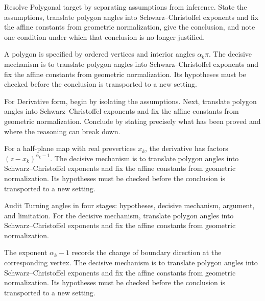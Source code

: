 \begin{problem}\label{prob:iv18-problem-01}
Resolve Polygonal target by separating assumptions from inference. State the assumptions, translate polygon angles into Schwarz--Christoffel exponents and fix the affine constants from geometric normalization, give the conclusion, and note one condition under which that conclusion is no longer justified.
\end{problem}
\begin{solution}
A polygon is specified by ordered vertices and interior angles $\alpha_k\pi$. The decisive mechanism is to translate polygon angles into Schwarz--Christoffel exponents and fix the affine constants from geometric normalization. Its hypotheses must be checked before the conclusion is transported to a new setting.
\end{solution}

\begin{problem}\label{prob:iv18-problem-02}
For Derivative form, begin by isolating the assumptions. Next, translate polygon angles into Schwarz--Christoffel exponents and fix the affine constants from geometric normalization. Conclude by stating precisely what has been proved and where the reasoning can break down.
\end{problem}
\begin{solution}
For a half-plane map with real prevertices $x_k$, the derivative has factors $(z-x_k)^{\alpha_k-1}$. The decisive mechanism is to translate polygon angles into Schwarz--Christoffel exponents and fix the affine constants from geometric normalization. Its hypotheses must be checked before the conclusion is transported to a new setting.
\end{solution}

\begin{problem}\label{prob:iv18-problem-03}
Audit Turning angles in four stages: hypotheses, decisive mechanism, argument, and limitation. For the decisive mechanism, translate polygon angles into Schwarz--Christoffel exponents and fix the affine constants from geometric normalization.
\end{problem}
\begin{solution}
The exponent $\alpha_k-1$ records the change of boundary direction at the corresponding vertex. The decisive mechanism is to translate polygon angles into Schwarz--Christoffel exponents and fix the affine constants from geometric normalization. Its hypotheses must be checked before the conclusion is transported to a new setting.
\end{solution}

